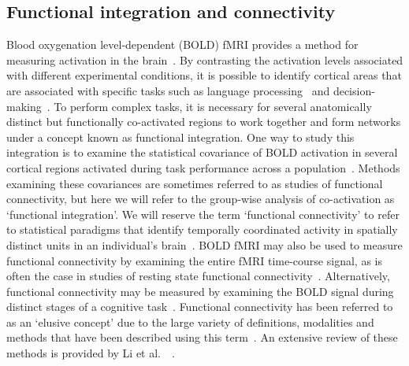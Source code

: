 \documentclass[final,authoryear,5p,times,twocolumn]{elsarticle}
\begin{document}
\subsection{Functional integration and connectivity}
Blood oxygenation level-dependent (BOLD) fMRI provides a method for measuring activation in the brain~\cite{Ogawa1990}. By contrasting the activation levels associated with different experimental conditions, it is possible to identify cortical areas that are associated with specific tasks such as language processing~\cite{Frost1999,Bookheimer2002} and decision-making~\cite{Sanfey2003,McCabe2001}. To perform complex tasks, it is necessary for several anatomically distinct but functionally co-activated regions to work together and form networks under a concept known as functional integration. One way to study this integration is to examine the statistical covariance of BOLD activation in several cortical regions activated during task performance across a population~\cite{Horwitz1990,McIntosh1994}. Methods examining these covariances are sometimes referred to as studies of functional connectivity, but here we will refer to the group-wise analysis of co-activation as `functional integration'. We will reserve the term `functional connectivity' to refer to statistical paradigms that identify temporally coordinated activity in spatially distinct units in an individual's brain~\cite{Rykhlevskaia2008}. BOLD fMRI may also be used to measure functional connectivity by examining the entire fMRI time-course signal, as is often the case in studies of resting state functional connectivity~\cite{Biswal1995,Damoiseaux2009}. Alternatively, functional connectivity may be measured by examining the BOLD signal during distinct stages of a cognitive task~\cite{Rissman2004}. Functional connectivity has been referred to as an `elusive concept' due to the large variety of definitions, modalities and methods that have been described using this term~\cite{Horwitz2003}. An extensive review of these methods is provided by Li et al.\ ~\cite{Li2009}.
\end{document}
